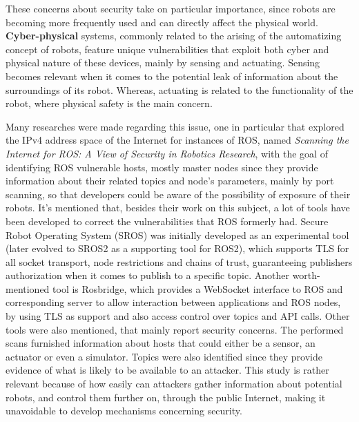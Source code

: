 These concerns about security take on particular importance, since robots are becoming more frequently used and can directly affect the physical world. \textbf{Cyber-physical} systems, commonly related to the arising of the automatizing concept of robots, feature unique vulnerabilities that exploit both cyber and physical nature of these devices, mainly by sensing and actuating. Sensing becomes relevant when it comes to the potential leak of information about the surroundings of its robot. Whereas, actuating is related to the functionality of the robot, where physical safety is the main concern. %

Many researches were made regarding this issue, one in particular that explored the IPv4 address space of the Internet for instances of ROS, named \textit{Scanning the Internet for ROS: A View of Security in Robotics Research}, with the goal of identifying ROS vulnerable hosts, mostly master nodes since they provide information about their related topics and node's parameters, mainly by port scanning, so that developers could be aware of the possibility of exposure of their robots. It's mentioned that, besides their work on this subject, a lot of tools have been developed to correct the vulnerabilities that ROS formerly had. Secure Robot Operating System (SROS) was initially developed as an experimental tool (later evolved to SROS2 as a supporting tool for ROS2), which supports TLS for all socket transport, node restrictions and chains of trust, guaranteeing publishers authorization when it comes to publish to a specific topic. Another worth-mentioned tool is Rosbridge, which provides a WebSocket interface to ROS and corresponding server to allow interaction between applications and ROS nodes, by using TLS as support and also access control over topics and API calls. Other tools were also mentioned, that mainly report security concerns. The performed scans furnished information about hosts that could either be a sensor, an actuator or even a simulator. Topics were also identified since they provide evidence of what is likely to be available to an attacker. This study is rather relevant because of how easily can attackers gather information about potential robots, and control them further on, through the public Internet, making it unavoidable to develop mechanisms concerning security.
            
